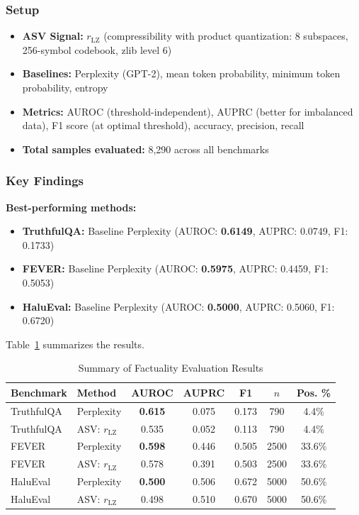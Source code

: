 \documentclass[11pt]{article}
\begin{document}
\subsubsection{Setup}
\begin{itemize}
\item \textbf{ASV Signal:} $r_{\text{LZ}}$ (compressibility with product quantization: 8 subspaces, 256-symbol codebook, zlib level 6)
\item \textbf{Baselines:} Perplexity (GPT-2), mean token probability, minimum token probability, entropy
\item \textbf{Metrics:} AUROC (threshold-independent), AUPRC (better for imbalanced data), F1 score (at optimal threshold), accuracy, precision, recall
\item \textbf{Total samples evaluated:} 8,290 across all benchmarks
\end{itemize}

\subsubsection{Key Findings}

\textbf{Best-performing methods:}
\begin{itemize}
\item \textbf{TruthfulQA:} Baseline Perplexity (AUROC: \textbf{0.6149}, AUPRC: 0.0749, F1: 0.1733)
\item \textbf{FEVER:} Baseline Perplexity (AUROC: \textbf{0.5975}, AUPRC: 0.4459, F1: 0.5053)
\item \textbf{HaluEval:} Baseline Perplexity (AUROC: \textbf{0.5000}, AUPRC: 0.5060, F1: 0.6720)
\end{itemize}

Table~\ref{tab:factuality-results} summarizes the results.

\begin{table}[h]
\centering
\caption{Summary of Factuality Evaluation Results}
\label{tab:factuality-results}
\begin{tabular}{llccccc}
\toprule
\textbf{Benchmark} & \textbf{Method} & \textbf{AUROC} & \textbf{AUPRC} & \textbf{F1} & $n$ & \textbf{Pos. \%} \\
\midrule
TruthfulQA & Perplexity & \textbf{0.615} & 0.075 & 0.173 & 790 & 4.4\% \\
TruthfulQA & ASV: $r_{\text{LZ}}$ & 0.535 & 0.052 & 0.113 & 790 & 4.4\% \\
\midrule
FEVER & Perplexity & \textbf{0.598} & 0.446 & 0.505 & 2500 & 33.6\% \\
FEVER & ASV: $r_{\text{LZ}}$ & 0.578 & 0.391 & 0.503 & 2500 & 33.6\% \\
\midrule
HaluEval & Perplexity & \textbf{0.500} & 0.506 & 0.672 & 5000 & 50.6\% \\
HaluEval & ASV: $r_{\text{LZ}}$ & 0.498 & 0.510 & 0.670 & 5000 & 50.6\% \\
\bottomrule
\end{tabular}
\end{table}
\end{document}
